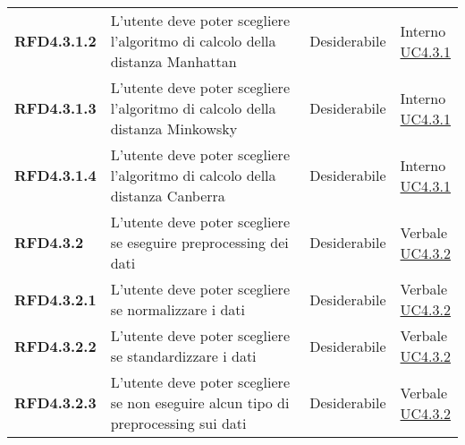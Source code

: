 \begin{longtable}[H]{| >{\raggedright\bfseries}m{20mm} | >{\raggedright}m{90mm} | >{\centering}m{25mm} | >{\centering\arraybackslash}m{30mm}|}
    RFD4.3.1.2
     & L'utente deve poter scegliere l'algoritmo di calcolo della distanza Manhattan
     & Desiderabile
     & \makecell{ Interno                                                                                                \\ \hyperref[par:uc4.3.1]{UC4.3.1} }\\

    RFD4.3.1.3
     & L'utente deve poter scegliere l'algoritmo di calcolo della distanza Minkowsky
     & Desiderabile
     & \makecell{ Interno                                                                                                \\ \hyperref[par:uc4.3.1]{UC4.3.1} }\\

    RFD4.3.1.4
     & L'utente deve poter scegliere l'algoritmo di calcolo della distanza Canberra
     & Desiderabile
     & \makecell{ Interno                                                                                                \\ \hyperref[par:uc4.3.1]{UC4.3.1} }\\

    RFD4.3.2
     & L'utente deve poter scegliere se eseguire preprocessing dei dati
     & Desiderabile
     & \makecell{ Verbale                                                                                                \\ \hyperref[par:uc4.3.2]{UC4.3.2} }\\

    RFD4.3.2.1
     & L'utente deve poter scegliere se normalizzare i dati
     & Desiderabile
     & \makecell{ Verbale                                                                                                \\ \hyperref[par:uc4.3.2]{UC4.3.2} }\\

    RFD4.3.2.2
     & L'utente deve poter scegliere se standardizzare i dati
     & Desiderabile
     & \makecell{ Verbale                                                                                                \\ \hyperref[par:uc4.3.2]{UC4.3.2} }\\

    RFD4.3.2.3
     & L'utente deve poter scegliere se non eseguire alcun tipo di preprocessing sui dati
     & Desiderabile
     & \makecell{ Verbale                                                                                                \\ \hyperref[par:uc4.3.2]{UC4.3.2} }\\



\end{longtable}
